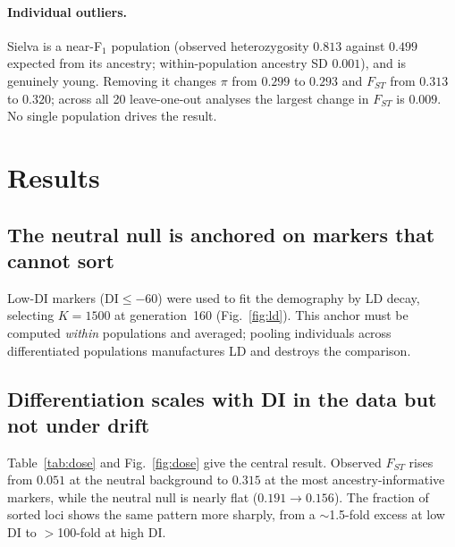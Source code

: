 \documentclass[11pt,a4paper]{article}
\begin{document}
\paragraph{Individual outliers.}
Sielva is a near-F$_1$ population (observed heterozygosity $0.813$ against
$0.499$ expected from its ancestry; within-population ancestry SD $0.001$), and
is genuinely young. Removing it changes $\pi$ from $0.299$ to $0.293$ and
$F_{ST}$ from $0.313$ to $0.320$; across all 20 leave-one-out analyses the
largest change in $F_{ST}$ is $0.009$. No single population drives the result.

\section{Results}

\subsection{The neutral null is anchored on markers that cannot sort}

Low-DI markers ($\mathrm{DI}\le-60$) were used to fit the demography by LD decay,
selecting $K=1500$ at generation~160 (Fig.~\ref{fig:ld}). This anchor must be
computed \emph{within} populations and averaged; pooling individuals across
differentiated populations manufactures LD and destroys the comparison.

\subsection{Differentiation scales with DI in the data but not under drift}

Table~\ref{tab:dose} and Fig.~\ref{fig:dose} give the central result. Observed
$F_{ST}$ rises from $0.051$ at the neutral background to $0.315$ at the most
ancestry-informative markers, while the neutral null is nearly flat
($0.191\rightarrow0.156$). The fraction of sorted loci shows the same pattern
more sharply, from a $\sim$1.5-fold excess at low DI to $>$100-fold at high DI.
\end{document}
